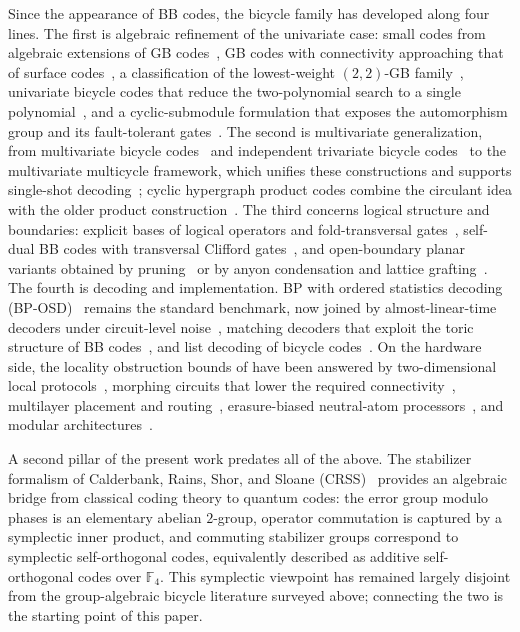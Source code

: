 \documentclass[journal,onecolumn]{IEEEtran}
\theoremstyle{definition}
\theoremstyle{remark}
\newcommand{\F}{\mathbb{F}}
\begin{document}
Since the appearance of BB codes, the bicycle family has developed along
four lines. The first is algebraic refinement of the univariate case: small
codes from algebraic extensions of GB codes~\cite{GBExt}, GB codes with
connectivity approaching that of surface codes~\cite{GBLC}, a
classification of the lowest-weight $(2,2)$-GB family~\cite{GB22},
univariate bicycle codes that reduce the two-polynomial search to a single
polynomial~\cite{UB26}, and a cyclic-submodule formulation that exposes the
automorphism group and its fault-tolerant gates~\cite{GBauto}. The second
is multivariate generalization, from multivariate bicycle codes~\cite{MB24}
and independent trivariate bicycle codes~\cite{ITB} to the multivariate
multicycle framework, which unifies these constructions and supports
single-shot decoding~\cite{MM26}; cyclic hypergraph product codes combine
the circulant idea with the older product construction~\cite{CHGP}. The
third concerns logical structure and boundaries: explicit bases of logical
operators and fold-transversal gates~\cite{ES24}, self-dual BB codes with
transversal Clifford gates~\cite{LC25}, and open-boundary planar variants
obtained by pruning~\cite{Prune} or by anyon condensation and lattice
grafting~\cite{Planar}. The fourth is decoding and implementation. BP with
ordered statistics decoding (BP-OSD)~\cite{PK21} remains the standard
benchmark, now joined by almost-linear-time decoders under circuit-level
noise~\cite{BPOTF}, matching decoders that exploit the toric structure of
BB codes~\cite{SWB26, Tan26}, and list decoding of bicycle codes~\cite{ListDec}.
On the hardware side, the locality obstruction bounds of
\cite{Bounds21} have been answered by two-dimensional local
protocols~\cite{Local2D}, morphing circuits that lower the required
connectivity~\cite{Morphing}, multilayer placement and
routing~\cite{HAL}, erasure-biased neutral-atom processors~\cite{Erasure},
and modular architectures~\cite{Modular}.

A second pillar of the present work predates all of the above. The
stabilizer formalism of Calderbank, Rains, Shor, and Sloane
(CRSS)~\cite{CRSS98} provides an algebraic bridge from classical coding
theory to quantum codes: the error group modulo phases is an elementary
abelian $2$-group, operator commutation is captured by a symplectic inner
product, and commuting stabilizer groups correspond to symplectic
self-orthogonal codes, equivalently described as additive self-orthogonal
codes over $\F_4$. This symplectic viewpoint has remained largely disjoint
from the group-algebraic bicycle literature surveyed above; connecting the
two is the starting point of this paper.
\end{document}
